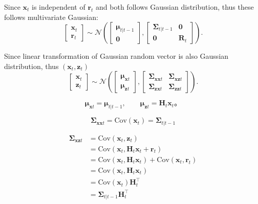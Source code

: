 \documentclass[../Bayesian_Inference.tex]{subfiles}
\begin{document}
Since $\bm{x}_t$ is independent of $\bm{r}_t$ and both follows Gaussian distribution, thus these follows multivariate Gaussian:
\[
    \begin{bmatrix}
        \bm{x}_t \\
        \bm{r}_t
    \end{bmatrix} 
    \sim 
    \mathcal{N} \left(\begin{bmatrix}
        \bm{\mu}_{t|t-1} \\
        \mathbf{0}
    \end{bmatrix},
    \begin{bmatrix}
        \mathbf{\Sigma}_{t|t-1} & \mathbf{0} \\
        \mathbf{0} & \mathbf{R}_t
    \end{bmatrix} 
    \right).
\]

Since linear transformation of Gaussian random vector is also Gaussian distribution, thus $(\bm{x}_t, \bm{z}_t)$ \[
    \begin{bmatrix}
        \bm{x}_t \\
        \bm{z}_t
    \end{bmatrix} 
    \sim 
    \mathcal{N} \left(\begin{bmatrix}
        \bm{\mu}_{\bm{x}t} \\
        \bm{\mu}_{\bm{z}t}
    \end{bmatrix},
    \begin{bmatrix}
        \mathbf{\Sigma}_{\bm{x}\bm{x}t} & \mathbf{\Sigma}_{\bm{x}\bm{z}t} \\
        \mathbf{\Sigma}_{\bm{z}\bm{x}t} & \mathbf{\Sigma}_{\bm{z}\bm{z}t}
    \end{bmatrix} 
    \right).
\]

\[
    \bm{\mu}_{\bm{x}t} = \bm{\mu}_{t|t-1}, \qquad \bm{\mu}_{\bm{z}t} = \mathbf{H}_t \bm{x}_t。
\]

\[
    \mathbf{\Sigma}_{\bm{x}\bm{x}t} = \mathrm{Cov}(\bm{x}_t) = \mathbf{\Sigma}_{t | t-1}
\]

\[
\begin{aligned}
    \mathbf{\Sigma}_{\bm{x}\bm{z}t} & = \mathrm{Cov}(\bm{x}_t,\bm{z}_t)  \\ 
    & = \mathrm{Cov}(\bm{x}_t,\mathbf{H}_t \bm{x}_t + \bm{r}_t) \\ 
    & = \mathrm{Cov}(\bm{x}_t,\mathbf{H}_t \bm{x}_t) + \mathrm{Cov}(\bm{x}_t, \bm{r}_t) \\ 
    & = \mathrm{Cov}(\bm{x}_t,\mathbf{H}_t \bm{x}_t) \\ 
    & = \mathrm{Cov}(\bm{x}_t) \mathbf{H}_t^{\top} \\
    & = \mathbf{\Sigma}_{t | t-1} \mathbf{H}_t^{\top}
\end{aligned}
\] 
\end{document}

